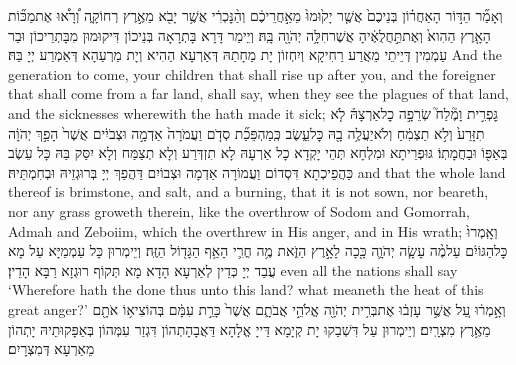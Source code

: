 {וְאָמַ֞ר הַדּ֣וֹר הָאַחֲר֗וֹן בְּנֵיכֶם֙ אֲשֶׁ֤ר יָק֙וּמוּ֙ מֵאַ֣חֲרֵיכֶ֔ם וְהַ֨נׇּכְרִ֔י אֲשֶׁ֥ר יָבֹ֖א מֵאֶ֣רֶץ רְחוֹקָ֑ה וְ֠רָא֠וּ אֶת\maqqaf מַכּ֞וֹת הָאָ֤רֶץ הַהִוא֙ וְאֶת\maqqaf תַּ֣חֲלֻאֶ֔יהָ אֲשֶׁר\maqqaf חִלָּ֥ה יְהֹוָ֖ה בָּֽהּ׃}
{וְיֵימַר דָּרָא בָּתְרָאָה בְּנֵיכוֹן דִּיקוּמוּן מִבָּתְרֵיכוֹן וּבַר עַמְמִין דְּיֵיתֵי מֵאֲרַע רַחִיקָא וְיִחְזוֹן יָת מַחָתַהּ דְּאַרְעָא הַהִיא וְיָת מַרְעַהָא דְּאַמְרַע יְיָ בַּהּ׃}
{And the generation to come, your children that shall rise up after you, and the foreigner that shall come from a far land, shall say, when they see the plagues of that land, and the sicknesses wherewith the \lord\space hath made it sick;}{}
{גׇּפְרִ֣ית וָמֶ֘לַח֮ שְׂרֵפָ֣ה כׇל\maqqaf אַרְצָהּ֒ לֹ֤א תִזָּרַע֙ וְלֹ֣א תַצְמִ֔חַ וְלֹא\maqqaf יַעֲלֶ֥ה בָ֖הּ כׇּל\maqqaf עֵ֑שֶׂב כְּֽמַהְפֵּכַ֞ת סְדֹ֤ם וַעֲמֹרָה֙ אַדְמָ֣ה וּצְבֹיִ֔ים אֲשֶׁר֙ הָפַ֣ךְ יְהֹוָ֔ה בְּאַפּ֖וֹ וּבַחֲמָתֽוֹ׃}
{גּוּפְרֵיתָא וּמִלְחָא תְּהֵי יָקְדָא כָל אַרְעָהּ לָא תִזְדְּרַע וְלָא תְצַמַּח וְלָא יִסַּק בַּהּ כָּל עֵשֶׂב כַּהֲפֵיכְתָא דִּסְדוֹם וַעֲמוֹרָה אַדְמָה וּצְבוֹיִם דַּהֲפַךְ יְיָ בְּרוּגְזֵיהּ וּבְחִמְתֵּיהּ׃}
{and that the whole land thereof is brimstone, and salt, and a burning, that it is not sown, nor beareth, nor any grass groweth therein, like the overthrow of Sodom and Gomorrah, Admah and Zeboiim, which the \lord\space overthrew in His anger, and in His wrath;}{}
{וְאָֽמְרוּ֙ כׇּל\maqqaf הַגּוֹיִ֔ם עַל\maqqaf מֶ֨ה עָשָׂ֧ה יְהֹוָ֛ה כָּ֖כָה לָאָ֣רֶץ הַזֹּ֑את מֶ֥ה חֳרִ֛י הָאַ֥ף הַגָּד֖וֹל הַזֶּֽה׃}
{וְיֵימְרוּן כָּל עַמְמַיָּא עַל מָא עֲבַד יְיָ כְּדֵין לְאַרְעָא הָדָא מָא תְּקוֹף רוּגְזָא רַבָּא הָדֵין׃}
{even all the nations shall say ‘Wherefore hath the \lord\space done thus unto this land? what meaneth the heat of this great anger?’}{}
{וְאָ֣מְר֔וּ עַ֚ל אֲשֶׁ֣ר עָזְב֔וּ אֶת\maqqaf בְּרִ֥ית יְהֹוָ֖ה אֱלֹהֵ֣י אֲבֹתָ֑ם אֲשֶׁר֙ כָּרַ֣ת עִמָּ֔ם בְּהוֹצִיא֥וֹ אֹתָ֖ם מֵאֶ֥רֶץ מִצְרָֽיִם׃}
{וְיֵימְרוּן עַל דִּשְׁבַקוּ יָת קְיָמָא דַּייָ אֱלָהָא דַּאֲבָהָתְהוֹן דִּגְזַר עִמְּהוֹן בְּאַפָּקוּתֵיהּ יָתְהוֹן מֵאַרְעָא דְּמִצְרָיִם׃}
